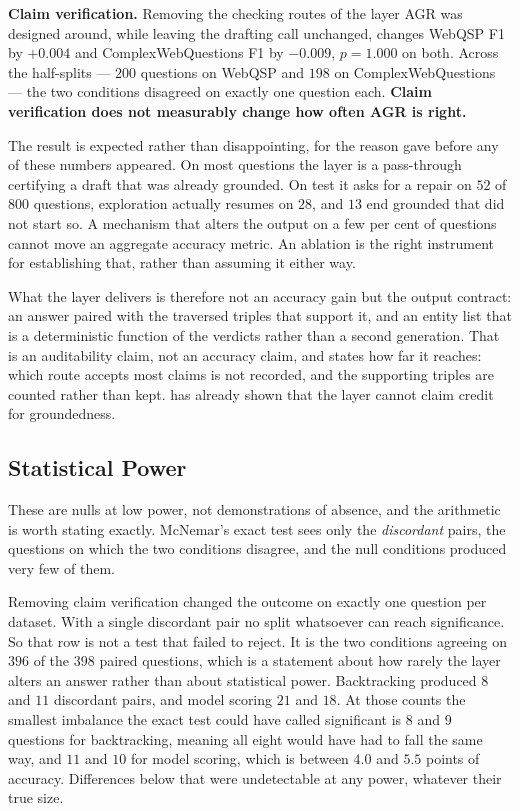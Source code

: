 \textbf{Claim verification.} Removing the checking routes of the layer
AGR was designed around, while leaving the drafting call unchanged,
changes WebQSP F1 by $+0.004$ and ComplexWebQuestions F1 by $-0.009$, $p
= 1.000$ on both. Across the half-splits --- $200$ questions on WebQSP
and $198$ on ComplexWebQuestions --- the two conditions disagreed on
exactly one question each. \textbf{Claim verification does not
measurably change how often AGR is right.}

The result is expected rather than disappointing, for the reason
 gave before any of these numbers appeared. On
most questions the layer is a pass-through certifying a draft that was
already grounded. On test it asks for a repair on $52$ of $800$
questions, exploration actually resumes on $28$, and $13$ end grounded
that did not start so. A mechanism that alters the output on a few per
cent of questions cannot move an aggregate accuracy metric. An ablation
is the right instrument for establishing that, rather than assuming it
either way.

What the layer delivers is therefore not an accuracy gain but the output
contract: an answer paired with the traversed triples that support it,
and an entity list that is a deterministic function of the verdicts
rather than a second generation. That is an auditability claim, not an
accuracy claim, and  states how far it
reaches: which route accepts most claims is not recorded, and the
supporting triples are counted rather than kept. 
has already shown that the layer cannot claim credit for groundedness.

\subsection{Statistical Power}\label{sec:power}

These are nulls at low power, not demonstrations of absence, and the
arithmetic is worth stating exactly. McNemar's exact test sees only the
\emph{discordant} pairs, the questions on which the two conditions
disagree, and the null conditions produced very few of them.

Removing claim verification changed the outcome on exactly one question
per dataset. With a single discordant pair no split whatsoever can reach
significance. So that row is not a test that failed to reject. It is the
two conditions agreeing on $396$ of the $398$ paired questions, which is
a statement about how rarely the layer alters an answer rather than
about statistical power. Backtracking produced $8$ and $11$ discordant
pairs, and model scoring $21$ and $18$. At those counts the smallest
imbalance the exact test could have called significant is $8$ and $9$
questions for backtracking, meaning all eight would have had to fall the
same way, and $11$ and $10$ for model scoring, which is between $4.0$
and $5.5$ points of accuracy. Differences below that were undetectable
at any power, whatever their true size.

